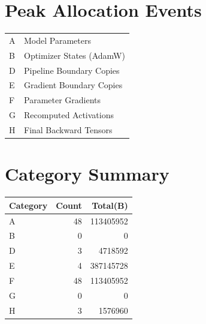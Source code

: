 \documentclass{article}
\begin{document}
\section*{Peak Allocation Events}
\small
\begin{tabular}{ll}
A & Model Parameters \\
B & Optimizer States (AdamW) \\
D & Pipeline Boundary Copies \\
E & Gradient Boundary Copies \\
F & Parameter Gradients \\
G & Recomputed Activations \\
H & Final Backward Tensors \\
\end{tabular}
\vspace{0.5em}
\section*{Category Summary}
\begin{tabular}{l r r}
Category & Count & Total(B) \\
\hline
A & 48 & 113405952 \\
B & 0 & 0 \\
D & 3 & 4718592 \\
E & 4 & 387145728 \\
F & 48 & 113405952 \\
G & 0 & 0 \\
H & 3 & 1576960 \\
\end{tabular}
\vspace{0.5em}
\end{document}
